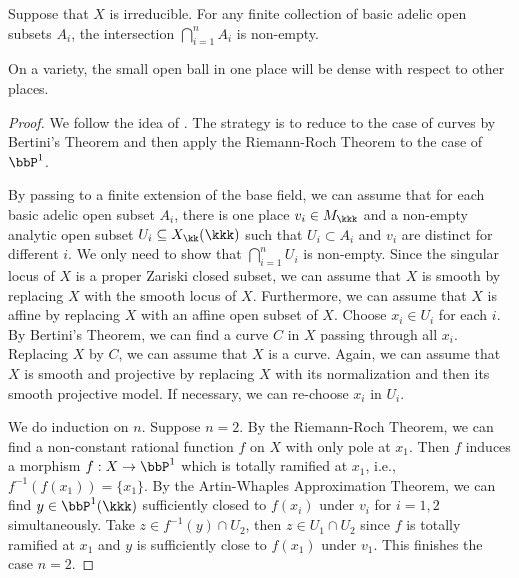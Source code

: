     \begin{lemma}\label{lem:intersection_of_basic_adelic_subset_is_nonempty}
        Suppose that \(X\) is irreducible.
        For any finite collection of basic adelic open subsets \(A_i\), the intersection \(\bigcap_{i=1}^n A_i\) is non-empty.
    \end{lemma}
    \begin{slogan}
        On a variety, the small open ball in one place will be dense with respect to other places.
    \end{slogan}
    \begin{proof}
        We follow the idea of \cite{ManZan14:AWapproxOnVarieties}.
        The strategy is to reduce to the case of curves by Bertini's Theorem and then apply the Riemann-Roch Theorem to the case of \(\bbP^1\).

        By passing to a finite extension of the base field, we can assume that for each basic adelic open subset \(A_i\), 
        there is one place \(v_i \in M_\kkk\) and a non-empty analytic open subset \(U_i \subseteq X_{\kk}(\kkk)\) such that \(U_i \subset A_i\) and \(v_i\) are distinct for different \(i\).
        We only need to show that \(\bigcap_{i=1}^n U_i\) is non-empty.
        Since the singular locus of \(X\) is a proper Zariski closed subset, we can assume that \(X\) is smooth by replacing \(X\) with the smooth locus of \(X\).
        Furthermore, we can assume that \(X\) is affine by replacing \(X\) with an affine open subset of \(X\).
        Choose \(x_i \in U_i\) for each \(i\).
        By Bertini's Theorem, we can find a curve \(C\) in \(X\) passing through all \(x_i\).
        Replacing \(X\) by \(C\), we can assume that \(X\) is a curve.
        Again, we can assume that \(X\) is smooth and projective by replacing \(X\) with its normalization and then its smooth projective model.
        If necessary, we can re-choose \(x_i\) in \(U_i\).

        We do induction on \(n\).
        Suppose \(n=2\).
        By the Riemann-Roch Theorem, we can find a non-constant rational function \(f\) on \(X\) with only pole at \(x_1\).
        Then \(f\) induces a morphism \(f: X \to \bbP^1\) which is totally ramified at \(x_1\), i.e., \(f^{-1}(f(x_1)) = \{x_1\}\).
        By the Artin-Whaples Approximation Theorem, we can find \(y \in \bbP^1(\kkk)\) sufficiently closed to \(f(x_i)\) under \(v_i\) for \(i=1,2\) simultaneously.
        Take \(z \in f^{-1}(y) \cap U_2\), then \(z \in U_1 \cap U_2\) since \(f\) is totally ramified at \(x_1\) and \(y\) is sufficiently close to \(f(x_1)\) under \(v_1\).
        This finishes the case \(n=2\).


\end{proof}

